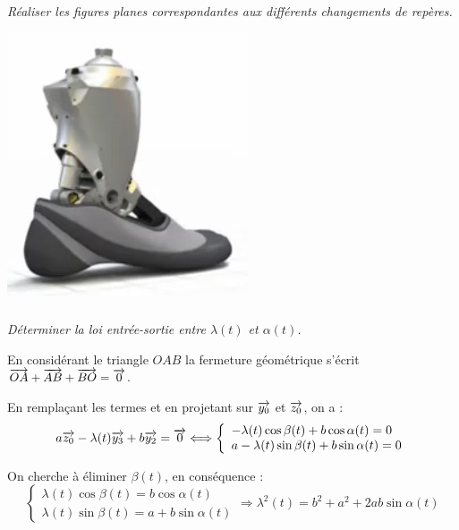 \documentclass[10pt,fleqn]{article} %
\begin{document}
\begin{multicols}{2}
\subparagraph{}
\textit{Réaliser les figures planes correspondantes aux différents changements de repères.} 

\ifprof
\begin{corrige}
\begin{center}
\includegraphics[width=.8\textwidth]{images/prot_01}
\end{center}
\end{corrige}
\else
\fi


\subparagraph{}
\textit{Déterminer la loi entrée-sortie entre $\lambda(t)$ et $\alpha(t)$.} 


\ifprof
\begin{corrige}
En considérant le triangle $OAB$ la fermeture géométrique s'écrit $\overrightarrow{OA}+\overrightarrow{AB}+\overrightarrow{BO}=\overrightarrow{0}$.

En remplaçant les termes et en projetant sur $\overrightarrow{y_0}$ et $\overrightarrow{z_0}$, on a :
$$
a\overrightarrow{z_{0}} - \lambda(t)\overrightarrow{y_3}+b\overrightarrow{y_2} = \overrightarrow{0} \Longleftrightarrow
\left\{
\begin{array}{l}
-\lambda(t)\cos \beta(t) +b\cos \alpha(t) = 0  \\
a -\lambda(t)\sin \beta(t) +b\sin \alpha(t) = 0
\end{array}
\right.
$$

On cherche à éliminer $\beta(t)$, en conséquence :
$$
\left\{
\begin{array}{l}
\lambda(t)\cos \beta(t)  = b\cos \alpha(t)  \\
\lambda(t)\sin \beta(t)  = a+ b\sin \alpha(t) 
\end{array}
\right.
\Longrightarrow
\lambda^2(t) = b^2 + a^2 + 2 a b \sin \alpha (t)
$$


\end{corrige}
\end{multicols}
\end{document}
